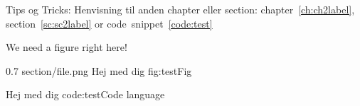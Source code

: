 Tips og Tricks:
Henvisning til anden chapter eller section:
chapter~\ref{ch:ch2label}, section~\ref{sc:sc2label} or code~snippet~\ref{code:test}

        

\missingfigure 
        {We need a figure right here!}

        {0.7                } %
        {section/file.png   } %
        {Hej med dig        } %
        {fig:testFig        } %
          
        {Hej med dig        } %
        {code:testCode      } %
        {language           } %